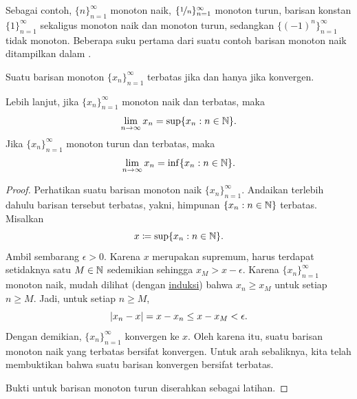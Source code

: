 Sebagai contoh,
$\{ n \}_{n=1}^\infty$ monoton naik,
$\{ \nicefrac{1}{n} \}_{n=1}^\infty$ monoton turun,
barisan konstan $\{ 1 \}_{n=1}^\infty$ sekaligus monoton naik dan monoton
turun, sedangkan $\bigl\{ {(-1)}^n \bigr\}_{n=1}^\infty$ tidak monoton.
Beberapa suku pertama dari suatu contoh barisan monoton naik
ditampilkan dalam 
.

\begin{myfigureht}
\caption{Beberapa suku pertama barisan monoton naik sebagai sebuah
grafik.\label{figsequenceincreasing}}
\end{myfigureht}

\begin{thm} \label{thm:monotoneconv}
%
Suatu barisan monoton $\{ x_n \}_{n=1}^\infty$ terbatas jika dan hanya jika konvergen.

Lebih lanjut, jika $\{ x_n \}_{n=1}^\infty$ monoton naik dan terbatas, maka
\begin{equation*}
\lim_{n\to \infty} x_n = \sup \{ x_n : n \in {\mathbb{N}} \} .
\end{equation*}
Jika $\{ x_n \}_{n=1}^\infty$ monoton turun dan terbatas, maka
\begin{equation*}
\lim_{n\to \infty} x_n = \inf \{ x_n : n \in {\mathbb{N}} \} .
\end{equation*}
\end{thm}

\begin{proof}
Perhatikan suatu barisan monoton naik $\{ x_n \}_{n=1}^\infty$.  Andaikan 
terlebih dahulu barisan tersebut terbatas,
yakni,
himpunan $\{ x_n : n \in  {\mathbb{N}} \}$ terbatas.  Misalkan
\begin{equation*}
x \coloneqq \sup \{ x_n : n \in {\mathbb{N}} \} .
\end{equation*}
Ambil sembarang $\epsilon > 0$.  Karena $x$ merupakan supremum,
harus terdapat setidaknya satu $M \in {\mathbb{N}}$ sedemikian sehingga $x_{M} > x-\epsilon$.
Karena $\{ x_n \}_{n=1}^\infty$ monoton naik,
mudah dilihat (dengan \hyperref[induction:thm]{induksi}) bahwa
$x_n \geq x_{M}$ untuk setiap $n \geq M$.  Jadi, untuk setiap $n \geq M$,
\begin{equation*}
\lvert {x_n-x} \rvert = x-x_n \leq x-x_{M} < \epsilon  .
\end{equation*}
Dengan demikian, $\{ x_n \}_{n=1}^\infty$ konvergen ke $x$.
Oleh karena itu, suatu barisan monoton naik yang terbatas bersifat konvergen.
Untuk arah sebaliknya, kita telah membuktikan bahwa suatu barisan konvergen
bersifat terbatas.

Bukti untuk barisan monoton turun diserahkan sebagai latihan.
\end{proof}

